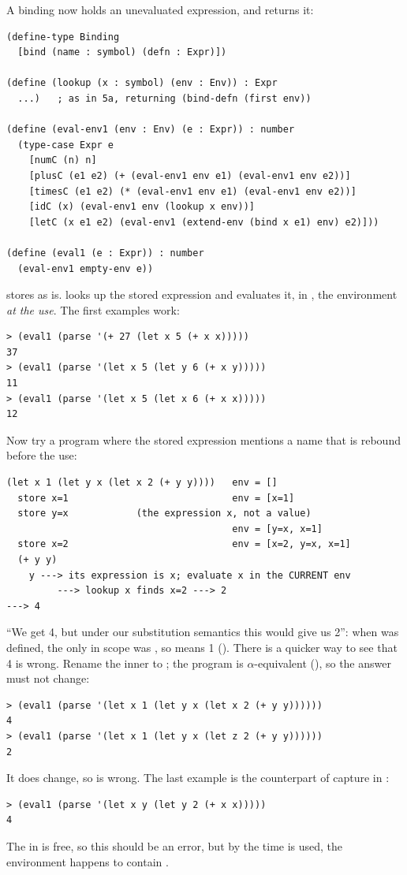 A binding now holds an unevaluated expression, and  returns it:
\begin{lstlisting}
(define-type Binding
  [bind (name : symbol) (defn : Expr)])

(define (lookup (x : symbol) (env : Env)) : Expr
  ...)   ; as in 5a, returning (bind-defn (first env))

(define (eval-env1 (env : Env) (e : Expr)) : number
  (type-case Expr e
    [numC (n) n]
    [plusC (e1 e2) (+ (eval-env1 env e1) (eval-env1 env e2))]
    [timesC (e1 e2) (* (eval-env1 env e1) (eval-env1 env e2))]
    [idC (x) (eval-env1 env (lookup x env))]
    [letC (x e1 e2) (eval-env1 (extend-env (bind x e1) env) e2)]))

(define (eval1 (e : Expr)) : number
  (eval-env1 empty-env e))
\end{lstlisting}
 stores  as is.  looks up the stored expression and evaluates it, in , the environment \emph{at the use}. The first examples work:
\begin{lstlisting}[style=repl]
> (eval1 (parse '(+ 27 (let x 5 (+ x x)))))
37
> (eval1 (parse '(let x 5 (let y 6 (+ x y)))))
11
> (eval1 (parse '(let x 5 (let x 6 (+ x x)))))
12
\end{lstlisting}
Now try a program where the stored expression mentions a name that is rebound before the use:
\begin{lstlisting}[style=repl]
(let x 1 (let y x (let x 2 (+ y y))))   env = []
  store x=1                             env = [x=1]
  store y=x            (the expression x, not a value)
                                        env = [y=x, x=1]
  store x=2                             env = [x=2, y=x, x=1]
  (+ y y)
    y ---> its expression is x; evaluate x in the CURRENT env
         ---> lookup x finds x=2 ---> 2
---> 4
\end{lstlisting}
``We get 4, but under our substitution semantics this would give us 2'': when  was defined, the only  in scope was , so  means 1 (). There is a quicker way to see that 4 is wrong. Rename the inner  to ; the program is $\alpha$-equivalent (), so the answer must not change:
\begin{lstlisting}[style=repl]
> (eval1 (parse '(let x 1 (let y x (let x 2 (+ y y))))))
4
> (eval1 (parse '(let x 1 (let y x (let z 2 (+ y y))))))
2
\end{lstlisting}
It does change, so  is wrong. The last example is the counterpart of capture in :
\begin{lstlisting}[style=repl]
> (eval1 (parse '(let x y (let y 2 (+ x x)))))
4
\end{lstlisting}
The  in  is free, so this should be an error, but by the time  is used, the environment happens to contain .

